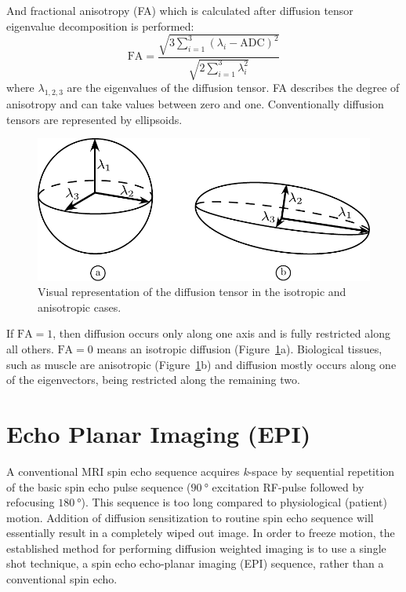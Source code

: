 And  fractional anisotropy (FA) which is calculated after diffusion tensor eigenvalue decomposition is performed:
\begin{equation}
\mathrm{FA}=\frac{\sqrt{3\displaystyle\sum_{i=1}^3 (\lambda_i-\mathrm{ADC})^2}}{\sqrt{2\displaystyle\sum_{i=1}^3 \lambda_i^2}}
\end{equation}
where $\lambda_{1,2,3}$ are the eigenvalues of the diffusion tensor.
FA describes the degree of anisotropy and can take values between zero and one. 
Conventionally diffusion tensors are represented by ellipsoids.
\begin{figure}[h]
\vspace{+0.2cm}
\centering
\includegraphics[scale=0.8]{Figures/DiffusionFA.pdf}
\caption[Visual representation of the diffusion tensor in the isotropic and anisotropic cases]{Visual representation of the diffusion tensor in the isotropic and anisotropic cases.}\label{fig: AnisIso}
\end{figure}
\noindent If $\mathrm{FA} = 1$, then diffusion occurs only along one axis and is fully restricted along all others. $\mathrm{FA} = 0$ means an isotropic diffusion (Figure~\ref{fig: AnisIso}a). 
Biological tissues, such as muscle are anisotropic (Figure~\ref{fig: AnisIso}b) and diffusion mostly occurs along one of the eigenvectors, being restricted along the remaining two.
\section{Echo Planar Imaging (EPI)}
\label{sec: EPI}
A conventional MRI spin echo sequence acquires \textit{k}-space by sequential repetition of the basic spin echo pulse sequence ($\SI{90}{\degree}$ excitation RF-pulse followed by refocusing $\SI{180}{\degree}$). 
This sequence is too long compared to physiological (patient) motion. 
Addition of diffusion sensitization to routine spin echo sequence will essentially result in a completely wiped out image. 
In order to freeze motion, the established method for performing diffusion weighted imaging is to use a single shot technique, a spin echo echo-planar imaging (EPI) sequence, rather than a conventional spin echo.

